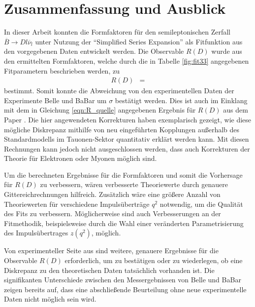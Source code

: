 \chapter{Zusammenfassung und Ausblick}

In dieser Arbeit konnten die Formfaktoren für den semileptonischen Zerfall $\overline{B} \to D l \overline{\nu}_l$ unter Nutzung der \enquote{Simplified Series Expansion} als Fitfunktion aus den vorgegebenen Daten entwickelt werden.
Die Observable $R(D)$ wurde aus den ermittelten Formfaktoren, welche durch die in Tabelle \ref{fig:fit33} angegebenen Fitparametern beschrieben werden, zu
\begin{align*}
  R(D) &= 
\end{align*}
bestimmt.
Somit konnte die Abweichung von den experimentellen Daten der Experimente Belle und BaBar um $\sigma$ bestätigt werden.
Dies ist auch im Einklang mit dem in Gleichung \eqref{eqn:R_quelle} angegebenen Ergebnis für $R(D)$ aus dem Paper \cite{PhysRevD.92.034506}.
Die hier angewendeten Korrekturen haben exemplarisch gezeigt, wie diese mögliche Diskrepanz mithilfe von neu eingeführten Kopplungen außerhalb des Standardmodells im Tauonen-Sektor quantitativ erklärt werden kann.
Mit diesen Rechnungen kann jedoch nicht ausgeschlossen werden, dass auch Korrekturen der Theorie für Elektronen oder Myonen möglich sind.

Um die berechneten Ergebnisse für die Formfaktoren und somit die Vorhersage für $R(D)$ zu verbessern, wären verbesserte Theoriewerte durch genauere Gittereichrechnungen hilfreich.
Zusätzlich wäre eine größere Anzahl von Theoriewerten für verschiedene Impulsüberträge $q^2$ notwendig, um die Qualität des Fits zu verbessern.
Möglicherweise sind auch Verbesserungen an der Fitmethodik, beispielsweise durch die Wahl einer veränderten Parametrisierung des Impulsübertrages $z(q^2)$, möglich.

Von experimenteller Seite aus sind weitere, genauere Ergebnisse für die Observable $R(D)$ erforderlich, um zu bestätigen oder zu wiederlegen, ob eine Diskrepanz zu den theoretischen Daten tatsächlich vorhanden ist.
Die signifikanten Unterschiede zwischen den Messergebnissen von Belle und BaBar zeigen bereits auf, dass eine abschließende Beurteilung ohne neue experimentelle Daten nicht möglich sein wird.
